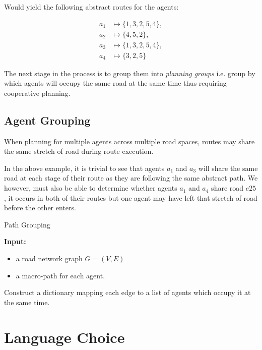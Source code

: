 Would yield the following abstract routes for the agents:


\begin{align*}
  a_{1} &\mapsto \{ 1,3,2,5,4 \}, \\
  a_{2} &\mapsto \{ 4,5,2 \}, \\
  a_{3} &\mapsto \{ 1,3,2,5,4 \} ,\\
  a_{4} &\mapsto \{ 3,2,5 \}
\end{align*}

The next stage in the process is to group them into \textit{planning groups} i.e. group by which agents will occupy the same road at the same time thus requiring cooperative planning.

\subsection{Agent Grouping}

When planning for multiple agents across multiple road spaces, routes may share the same stretch of road during route execution.

In the above example, it is trivial to see that agents $a_{1}$ and $a_{3}$ will share the same road at each stage of their route as they are following the same abstract path. We however, must also be able to determine whether agents $a_{1}$ and $a_{4}$ share road $e25$, it occurs in both of their routes but one agent may have left that stretch of road before the other enters.

\begin{algorithm}
  \caption{Path Grouping}
  \textbf{Input:}
  \begin{itemize}
    \item a road network graph $G = (V,E)$
    \item a macro-path for each agent.
  \end{itemize}


  Construct a dictionary mapping each edge to a list of agents which occupy it at the same time.
\end{algorithm}


\section{Language Choice}

